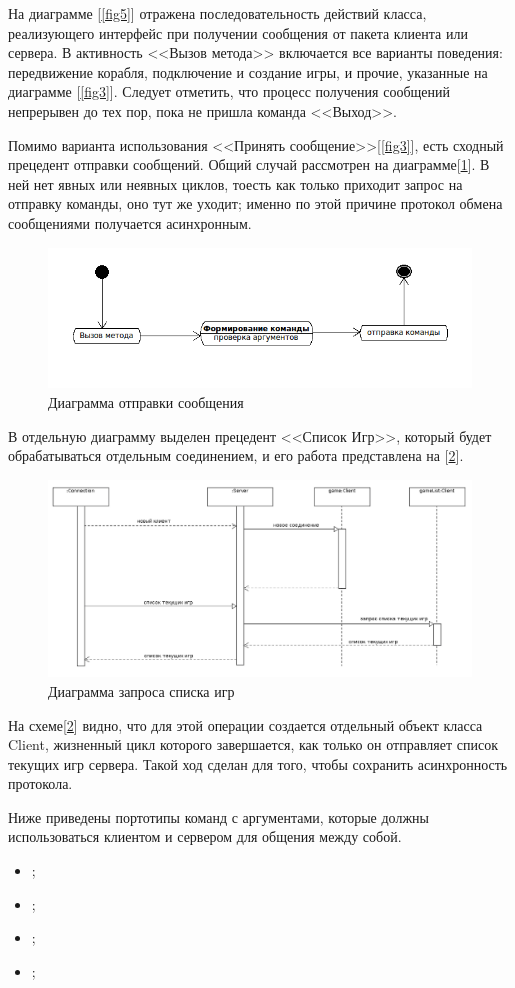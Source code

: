 На диаграмме [\ref{fig5}] отражена последовательность действий класса, реализующего интерфейс при получении сообщения от пакета клиента или сервера. В активность <<Вызов метода>> включается все варианты поведения: передвижение корабля, подключение и создание игры, и прочие, указанные на диаграмме  [\ref{fig3}]. Следует отметить, что процесс получения сообщений непрерывен до тех пор, пока не пришла команда <<Выход>>.

Помимо варианта использования <<Принять сообщение>>[\ref{fig3}], есть сходный прецедент отправки сообщений. Общий случай рассмотрен на диаграмме[\ref{fig6}]. В ней нет явных или неявных циклов, тоесть как только приходит запрос на отправку команды, оно тут же уходит; именно по этой причине протокол обмена сообщениями получается асинхронным. 
\begin{figure}[ht]
\centering
\includegraphics[width=18cm]{images/state1.png}
\caption{Диаграмма отправки сообщения}
\label{fig6}
\end{figure}

В отдельную диаграмму выделен прецедент <<Список Игр>>, который будет обрабатываться отдельным соединением, и его работа представлена на [\ref{fig7}]. 

\begin{figure}[ht]
\centering
\includegraphics[width=16cm]{images/par2.png}
\caption{Диаграмма запроса списка игр}
\label{fig7}
\end{figure}

На схеме[\ref{fig7}] видно, что для этой операции создается отдельный объект класса Client, жизненный цикл которого завершается, как только он отправляет список текущих игр сервера. Такой ход сделан для того, чтобы сохранить асинхронность протокола.

Ниже приведены портотипы команд с аргументами, которые должны использоваться клиентом и сервером для общения между собой.
	\begin{itemize}
		\item ;
		\item ;
		\item ;
		\item ;
  	\end{itemize} 
\endinput
